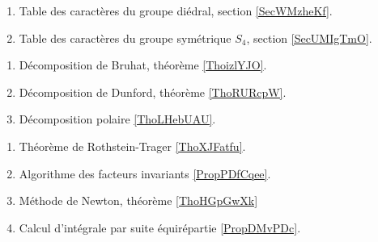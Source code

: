 \begin{enumerate}
    \item Table des caractères du groupe diédral, section \ref{SecWMzheKf}.
    \item Table des caractères du groupe symétrique \( S_4\), section \ref{SecUMIgTmO}.
\end{enumerate}

   \label{DECooWTAIooNkZAFg}
\begin{enumerate}
    \item 
        Décomposition de Bruhat, théorème \ref{ThoizlYJO}.
    \item 
        Décomposition de Dunford, théorème \ref{ThoRURcpW}. 
    \item 
        Décomposition polaire \ref{ThoLHebUAU}.
\end{enumerate}

\begin{enumerate}
    \item 
        Théorème de Rothstein-Trager \ref{ThoXJFatfu}.
    \item 
        Algorithme des facteurs invariants \ref{PropPDfCqee}.
    \item 
        Méthode de Newton, théorème \ref{ThoHGpGwXk}
    \item 
        Calcul d'intégrale par suite équirépartie \ref{PropDMvPDc}.
\end{enumerate}

